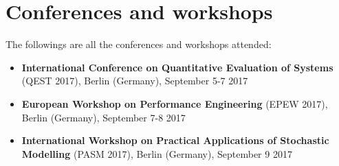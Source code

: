 
\section*{Conferences and workshops}

  The followings are all the conferences and workshops attended:
  
  \begin{itemize}
    \item \textbf{International Conference on Quantitative Evaluation of Systems} (QEST 2017), Berlin (Germany), September 5-7 2017
    \item \textbf{European Workshop on Performance Engineering} (EPEW 2017), Berlin (Germany), September 7-8 2017
    \item \textbf{International Workshop on Practical Applications of Stochastic Modelling} (PASM 2017), Berlin (Germany), September 9 2017
  \end{itemize}

\newpage
